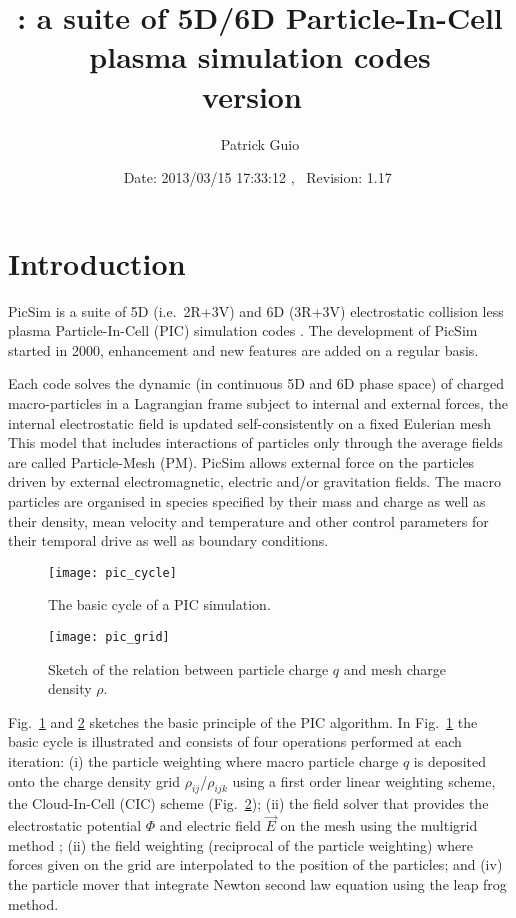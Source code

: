 \documentclass[10pt,a4paper]{article}
\title{\picsim: a suite of 5D/6D Particle-In-Cell\\ plasma simulation codes\\
version~\version}
\author{Patrick Guio}
\date{\normalsize$ $Date: 2013/03/15 17:33:12 $ $,~ $ $Revision: 1.17 $ $}
\newcommand*{\picsim}{\textsf{PicSim}\xspace}
\newcommand{\CIC}{\renewcommand{\CIC}{CIC\xspace}Cloud-In-Cell (CIC)\xspace}
\newcommand{\PIC}{\renewcommand{\PIC}{PIC\xspace}Particle-In-Cell (PIC)\xspace}
\begin{document}
\maketitle

\tableofcontents

\section{Introduction}
\picsim is a suite of 5D (i.e.\ 2R+3V) and 6D (3R+3V) electrostatic collision
less plasma \PIC simulation codes \citep{dawson:1983,birdsall:1985}.  The
development of \picsim started in 2000, enhancement and new features are
added on a regular basis.

Each code solves the dynamic (in continuous 5D and 6D phase space) of charged
macro-particles in a Lagrangian frame subject to internal and external
forces, the internal electrostatic field is updated self-consistently on a
fixed Eulerian mesh This model that includes interactions of particles only
through the average fields are called Particle-Mesh (PM).  \picsim allows
external force on the particles driven by external electromagnetic, electric
and/or gravitation fields. The macro particles are organised in species
specified by their mass and charge as well as their density, mean velocity
and temperature and other control parameters for their temporal drive as well
as boundary conditions.

\begin{figure}[ht]
\begin{center}
\texttt{[image: pic\_cycle]}
\end{center}
\caption[]{The basic cycle of a \PIC simulation.}
\label{fig:pic_cycle}
\end{figure}

\begin{figure}[ht]
\begin{center}
\texttt{[image: pic\_grid]}
\end{center}
\caption[]{Sketch of the relation between particle charge $q$ and mesh charge 
density $\rho$.}
\label{fig:pic_grid}
\end{figure}

Fig.~\ref{fig:pic_cycle} and \ref{fig:pic_grid} sketches the basic principle
of the \PIC algorithm.
In Fig.~\ref{fig:pic_cycle} the basic cycle is illustrated and consists of four
operations performed at each iteration: (i) the particle weighting where
macro particle charge $q$ is deposited onto the charge density grid
$\rho_{ij}$/$\rho_{ijk}$ using a first order linear weighting scheme,
the \CIC scheme (Fig.~\ref{fig:pic_grid});
(ii) the field solver that provides the electrostatic potential $\Phi$
and electric field $\vec{E}$ on the mesh using the multigrid
method \citep{wesseling:1991}; (ii) the field weighting (reciprocal of the
particle weighting) where forces given on the grid are interpolated
to the position of the particles; and (iv) the particle mover that integrate
Newton second law equation using the leap frog method.
\end{document}
